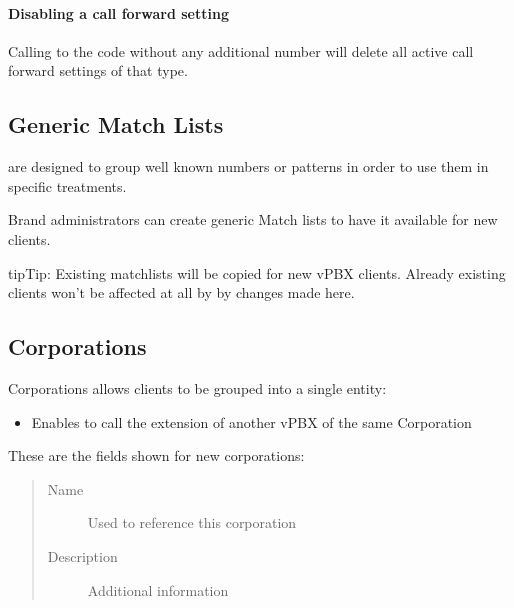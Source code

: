 \documentclass[letterpaper,10pt,english]{sphinxmanual}
\begin{document}
\paragraph{Disabling a call forward setting}

Calling to the code without any additional number will delete all active call forward settings of that type.


\subsection{Generic Match Lists}
\label{administration_portal/brand/settings/generic_match_lists:generic-match-lists}\label{administration_portal/brand/settings/generic_match_lists::doc}\label{administration_portal/brand/settings/generic_match_lists:brand-match-lists}
{\hyperref[administration_portal/client/vpbx/routing_tools/match_lists:id1]{}} are designed to group well known numbers or patterns in order to use them in specific treatments.

Brand administrators can create generic Match lists to have it available for new clients.

\begin{notice}{tip}{Tip:}
Existing matchlists will be copied for new vPBX clients. Already existing clients won't be affected at all by
by changes made here.
\end{notice}


\subsection{Corporations}
\label{administration_portal/brand/settings/corporations:corporations}\label{administration_portal/brand/settings/corporations::doc}\label{administration_portal/brand/settings/corporations:id1}
Corporations allows clients to be grouped into a single entity:
\begin{itemize}
\item {} 
Enables {\hyperref[administration_portal/client/vpbx/routing_endpoints/friends/internal_friends:internal\string-friends]{}} to call the extension of another vPBX of the same Corporation

\end{itemize}

These are the fields shown for new corporations:
\begin{quote}
\begin{description}
\item[{Name}] \leavevmode
Used to reference this corporation

\item[{Description}] \leavevmode
Additional information

\end{description}
\end{quote}
\end{document}
